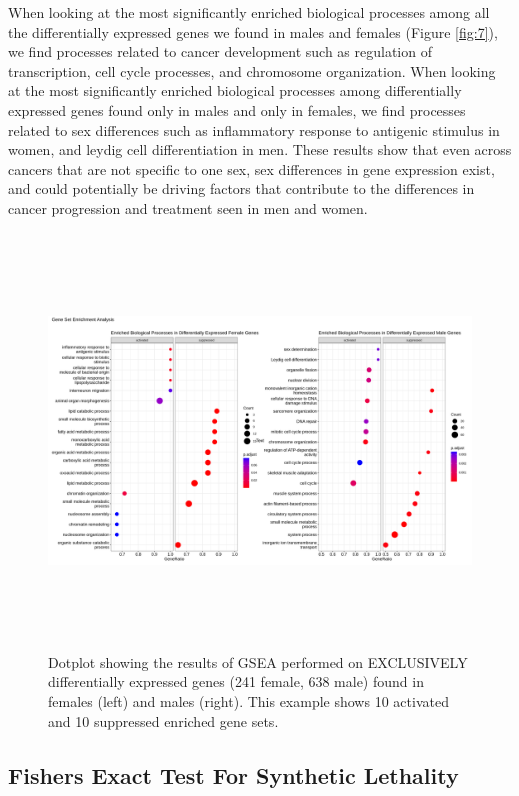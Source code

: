 \documentclass[10pt]{article}
\providecommand{\figref}[1]{Figure \ref{#1}}  %
\begin{document}
	When looking at the most significantly enriched biological processes among all the differentially expressed genes we found in males and females (\figref{fig:7}), we find processes related to cancer development such as regulation of transcription, cell cycle processes, and chromosome organization. When looking at the most significantly enriched biological processes among differentially expressed genes found only in males and only in females, we find processes related to sex differences such as inflammatory response to antigenic stimulus in women, and leydig cell differentiation in men. These results show that even across cancers that are not specific to one sex, sex differences in gene expression exist, and could potentially be driving factors that contribute to the differences in cancer progression and treatment seen in men and women.
		
	\begin{figure}[!h]
		\centering
		\includegraphics[width=\textwidth, height=11cm]{all_cancersgsea_exclusivedegenes_male_female_bp0.9.png}
		\caption{Dotplot showing the results of GSEA performed on EXCLUSIVELY differentially expressed genes (241 female, 638 male) found in females (left) and males (right). This example shows 10 activated and 10 suppressed enriched gene sets.}
		\label{fig:8}
	\end{figure}
	

	\subsection{Fishers Exact Test For Synthetic Lethality}
	
\end{document}
